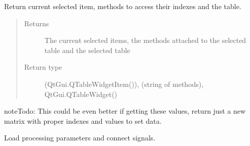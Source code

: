 \documentclass[a4paper,10pt,english]{sphinxmanual}
\begin{document}
\begin{fulllineitems}
\begin{fulllineitems}
\begin{quote}
\begin{description}
\end{description}\end{quote}

\end{fulllineitems}


\begin{fulllineitems}
\label{\detokenize{autodoc/mrsprint/mrsprint:mrsprint.mainwindow.MainWindow.itemsMethodsTable2DEditor}}
Return current selected item, methods to access their indexes and the table.
\begin{quote}\begin{description}
\item[{Returns}] \leavevmode
The current selected items, the methods attached to the selected table and the selected table

\item[{Return type}] \leavevmode
{} (QtGui.QTableWidgetItem()),  (string of methods), QtGui.QTableWidget()

\end{description}\end{quote}

\begin{sphinxadmonition}{note}{\label{autodoc/mrsprint/mrsprint:index-2}Todo:}
This could be even better if getting these values, return just a new matrix
with proper indexes and values to set data.
\end{sphinxadmonition}

\end{fulllineitems}


\begin{fulllineitems}
\label{\detokenize{autodoc/mrsprint/mrsprint:mrsprint.mainwindow.MainWindow.loadProcessingParameters}}
Load processing parameters and connect signals.

\end{fulllineitems}



\end{fulllineitems}
\end{document}
